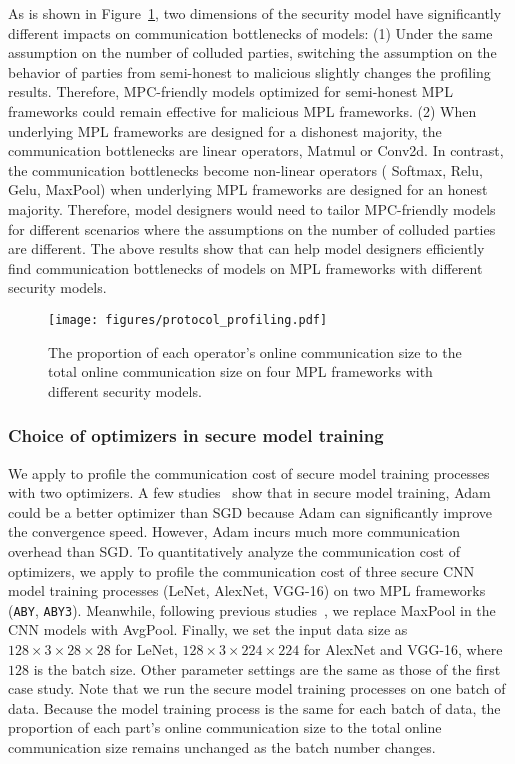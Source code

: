 As is shown in Figure~\ref{fig:protocol_profiling}, two dimensions of the security model have significantly different impacts on communication bottlenecks of models: (1) Under the same assumption on the number of colluded parties, switching the assumption on the behavior of parties from semi-honest to malicious slightly changes the profiling results. Therefore, MPC-friendly models optimized for semi-honest MPL frameworks could remain effective for malicious MPL frameworks.  (2) When underlying MPL frameworks are designed for a dishonest majority, the communication bottlenecks are linear operators,  Matmul or Conv2d. In contrast, the communication bottlenecks become non-linear operators ( Softmax, Relu, Gelu, MaxPool) when underlying MPL frameworks are designed for an honest majority. Therefore, model designers would need to tailor MPC-friendly models for different scenarios where the assumptions on the number of colluded parties are different. 
The above results show that \hawkeye can help model designers efficiently find communication bottlenecks of models on MPL frameworks with different security models. 

\begin{figure}[ht]
    \centering
    \texttt{[image: figures/protocol\_profiling.pdf]}
    \caption{The proportion of each operator's online communication size to the total online communication size on four MPL frameworks with different security models.}
    \label{fig:protocol_profiling}
\end{figure}

\subsubsection{Choice of optimizers in secure model training}  We apply \hawkeye to profile the communication cost of secure model training processes with two optimizers. A few studies~\cite{10.1145/3411501.3419427,DBLP:journals/popets/AttrapadungHIKM22} show that in secure model training, Adam~\cite{adam} could be a better optimizer than SGD because Adam can significantly improve the convergence speed. However, Adam incurs much more communication overhead than SGD. To quantitatively analyze the communication cost of optimizers, we apply \hawkeye to profile the communication cost of three secure CNN model training processes (LeNet, AlexNet, VGG-16) on two MPL frameworks (\texttt{ABY}, \texttt{ABY3}). Meanwhile, following previous studies~\cite{watson22piranha,cryptGPU}, we replace MaxPool in the CNN models with AvgPool. Finally, we set the input data size as $128 \times 3 \times 28 \times 28$ for LeNet, $128 \times 3 \times 224 \times 224$ for AlexNet and VGG-16, where $128$ is the batch size. Other parameter settings are the same as those of the first case study. Note that we run the secure model training processes on one batch of data.  Because the model training process is the same for each batch of data, the proportion of each part's online communication size to the total online communication size remains unchanged as the batch number changes.

